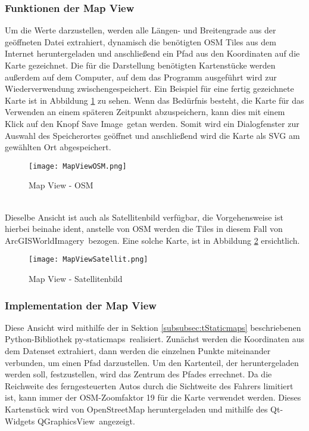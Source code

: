 \subsubsection{Funktionen der Map View}
\label{subsubsec:MapViewFunktion}
Um die Werte darzustellen, werden alle Längen- und Breitengrade aus der geöffneten Datei extrahiert, dynamisch die benötigten \ac{OSM} Tiles aus dem Internet heruntergeladen und anschließend ein Pfad aus den Koordinaten auf die Karte gezeichnet. Die für die Darstellung benötigten Kartenstücke werden außerdem auf dem Computer, auf dem das Programm ausgeführt wird zur Wiederverwendung zwischengespeichert. Ein Beispiel für eine fertig gezeichnete Karte ist in Abbildung 
\ref{fig:OSMMapView} zu sehen. Wenn das Bedürfnis besteht, die Karte für das Verwenden an einem späteren Zeitpunkt abzuspeichern, kann dies mit einem Klick auf den Knopf \glqq Save Image\grqq\ getan werden. Somit wird ein Dialogfenster zur Auswahl des Speicherortes geöffnet und anschließend wird die Karte als \ac{SVG} am gewählten Ort abgespeichert.
\begin{figure}[h]
\centering
\texttt{[image: MapViewOSM.png]}
\caption{Map View - \ac{OSM}}
\label{fig:OSMMapView}
\end{figure}
\\
Dieselbe Ansicht ist auch als Satellitenbild verfügbar, die Vorgehensweise ist hierbei beinahe ident, anstelle von \ac{OSM} werden die Tiles in diesem Fall von \glqq ArcGISWorldImagery\grqq\ bezogen. Eine solche Karte, ist in Abbildung \ref{fig:SatteliteMapView} ersichtlich. 
\newpage
\begin{figure}[h]
\centering
\texttt{[image: MapViewSatellit.png]}
\caption{Map View - Satellitenbild}
\label{fig:SatteliteMapView}
\end{figure}

\subsubsection{Implementation der Map View}
\label{subsubsec:MapViewImplementation}
Diese Ansicht wird mithilfe der in Sektion \ref{subsubsec:tStaticmaps} beschriebenen Python-Bibliothek \glqq py-staticmaps\grqq \ realisiert. Zunächst werden die Koordinaten aus dem Datenset extrahiert, dann werden die einzelnen Punkte miteinander verbunden, um einen Pfad darzustellen. Um den Kartenteil, der heruntergeladen werden soll, festzustellen, wird das Zentrum des Pfades errechnet. Da die Reichweite des ferngesteuerten Autos durch die Sichtweite des Fahrers limitiert ist, kann immer der \ac{OSM}-Zoomfaktor 19 für die Karte verwendet werden. Dieses Kartenstück wird von OpenStreetMap heruntergeladen und mithilfe des Qt-Widgets \glqq QGraphicsView\grqq\ angezeigt.
